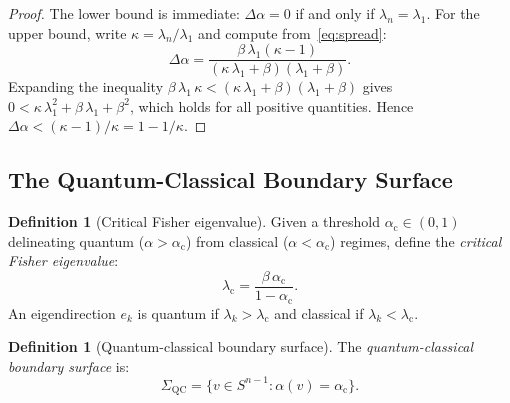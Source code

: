 \documentclass[11pt,a4paper]{article}
\theoremstyle{plain}
\theoremstyle{definition}
\newtheorem{definition}[theorem]{Definition}
\newcommand{\Sn}{S^{n-1}}
\newcommand{\SigmaQC}{\Sigma_{\mathrm{QC}}}
\newcommand{\alphac}{\alpha_{\mathrm{c}}}
\newcommand{\lamc}{\lambda_{\mathrm{c}}}
\begin{document}
\begin{proof}
The lower bound is immediate: $\Delta\alpha = 0$ if and only if
$\lambda_n = \lambda_1$.  For the upper bound, write
$\kappa = \lambda_n/\lambda_1$ and compute from~\eqref{eq:spread}:
\[
\Delta\alpha
  = \frac{\beta\,\lambda_1(\kappa - 1)}
         {(\kappa\,\lambda_1 + \beta)(\lambda_1 + \beta)}.
\]
Expanding the inequality $\beta\,\lambda_1\,\kappa <
(\kappa\,\lambda_1 + \beta)(\lambda_1 + \beta)$ gives
$0 < \kappa\,\lambda_1^2 + \beta\,\lambda_1 + \beta^2$,
which holds for all positive quantities.  Hence
$\Delta\alpha < (\kappa-1)/\kappa = 1 - 1/\kappa$.
\end{proof}


\subsection{The Quantum-Classical Boundary Surface}

\begin{definition}[Critical Fisher eigenvalue]
\label{def:critical}
Given a threshold $\alphac \in (0,1)$ delineating quantum
($\alpha > \alphac$) from classical ($\alpha < \alphac$) regimes,
define the \emph{critical Fisher eigenvalue}:
\begin{equation}
\label{eq:lambda_c}
\lamc = \frac{\beta\,\alphac}{1 - \alphac}.
\end{equation}
An eigendirection $e_k$ is quantum if $\lambda_k > \lamc$ and
classical if $\lambda_k < \lamc$.
\end{definition}

\begin{definition}[Quantum-classical boundary surface]
\label{def:sigma_qc}
The \emph{quantum-classical boundary surface} is:
\begin{equation}
\label{eq:sigma_qc}
\SigmaQC = \bigl\{ v \in \Sn : \alpha(v) = \alphac \bigr\}.
\end{equation}
\end{definition}
\end{document}
